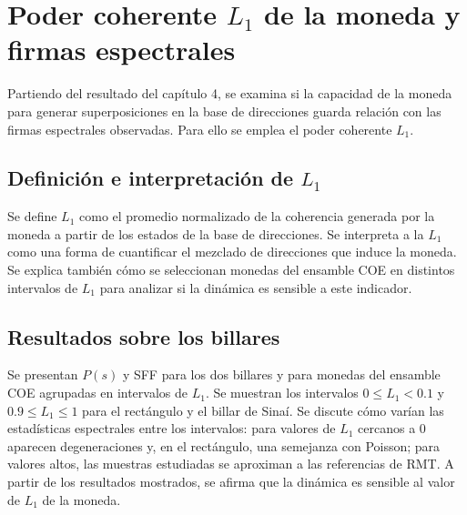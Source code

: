 \documentclass[12pt,a4paper,oneside]{report} %
\begin{document}
\chapter{Poder coherente \texorpdfstring{$L_1$}{L1} de la moneda y firmas espectrales} %


Partiendo del resultado del capítulo 4, se examina si la capacidad de la moneda para generar superposiciones en la base de direcciones guarda relación con las firmas espectrales observadas. Para ello se emplea el poder coherente $L_1$.

\section{Definición e interpretación de \texorpdfstring{$L_1$}{L1}} %
Se define $L_1$ como el promedio normalizado de la coherencia generada por la moneda a partir de los estados de la base de direcciones. Se interpreta a la $L_1$ como una forma de cuantificar el mezclado de direcciones que induce la moneda. Se explica también cómo se seleccionan monedas del ensamble COE en distintos intervalos de $L_1$ para analizar si la dinámica es sensible a este indicador.

\section{Resultados sobre los billares} %

Se presentan $P(s)$ y SFF para los dos billares y para monedas del ensamble COE agrupadas en intervalos de $L_1$. Se muestran los intervalos $0\leq L_1<0.1$ y $0.9\leq L_1\leq 1$ para el rectángulo y el billar de Sinaí. Se discute cómo varían las estadísticas espectrales entre los intervalos: para valores de $L_1$ cercanos a 0 aparecen degeneraciones y, en el rectángulo, una semejanza con Poisson; para valores altos, las muestras estudiadas se aproximan a las referencias de RMT. A partir de los resultados mostrados, se afirma que la dinámica es sensible al valor de $L_1$ de la moneda.
\end{document}
